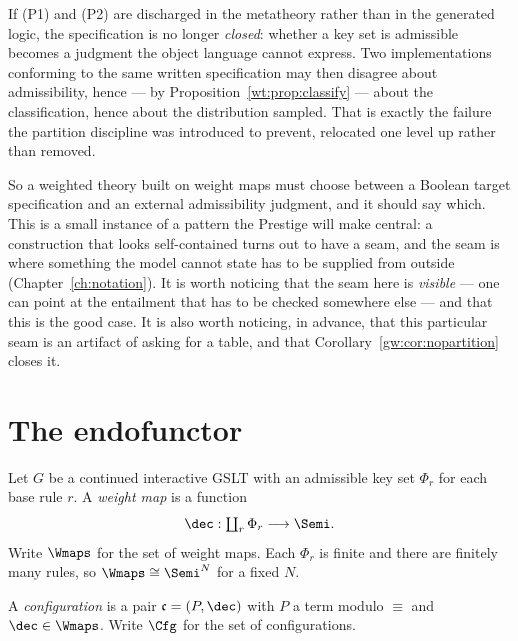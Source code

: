 \begin{observation}
\label{wt:obs:closure}
If (P1) and (P2) are discharged in the metatheory rather than in the generated logic, the
specification is no longer \emph{closed}: whether a key set is admissible becomes a
judgment the object language cannot express. Two implementations conforming to the same
written specification may then disagree about admissibility, hence --- by
Proposition~\ref{wt:prop:classify} --- about the classification, hence about the
distribution sampled. That is exactly the failure the partition discipline was introduced
to prevent, relocated one level up rather than removed.
\end{observation}

So a weighted theory built on weight maps must choose between a Boolean target
specification and an external admissibility judgment, and it should say which. This is a
small instance of a pattern the Prestige will make central: a construction that looks
self-contained turns out to have a seam, and the seam is where something the model cannot
state has to be supplied from outside (Chapter~\ref{ch:notation}). It is worth noticing
that the seam here is \emph{visible} --- one can point at the entailment that has to be
checked somewhere else --- and that this is the good case. It is also worth noticing, in
advance, that this particular seam is an artifact of asking for a table, and that
Corollary~\ref{gw:cor:nopartition} closes it.

\section{The endofunctor}
\label{wt:sec:functor}

\begin{definition}
\label{wt:def:wmap}
Let $G$ be a continued interactive GSLT with an admissible key set $\Phi_r$ for each base
rule $r$. A \emph{weight map} is a function
\[
  \dec : \textstyle\coprod_r \Phi_r \longrightarrow \Semi .
\]
Write $\Wmaps$ for the set of weight maps. Each $\Phi_r$ is finite and there are finitely
many rules, so $\Wmaps \cong \Semi^N$ for a fixed $N$.
\end{definition}

\begin{definition}[Configuration]
\label{wt:def:config}
A \emph{configuration} is a pair $\mathfrak{c} = (P, \dec)$ with $P$ a term modulo
$\equiv$ and $\dec \in \Wmaps$. Write $\Cfg$ for the set of configurations.
\end{definition}

